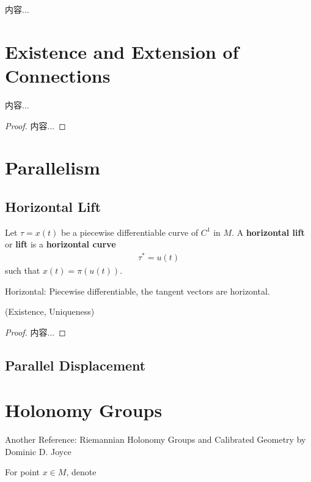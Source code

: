 \documentclass[Total.tex]{subfiles}
\begin{document}
			\begin{proposition}
				内容...
			\end{proposition}
		
		\section{Existence and Extension of Connections}
			
			\begin{theorem}
				内容...
			\end{theorem}
			\begin{proof}
				内容...
			\end{proof}
		\section{Parallelism}
			\subsection{Horizontal Lift}
				
				\begin{Def}
					Let $\tau=x(t)$ be a piecewise differentiable curve of $C^1$ in $M$. A \textbf{horizontal lift} or \textbf{lift} is a \textbf{horizontal curve}
					\begin{gather*}
						\tau^*=u(t)
					\end{gather*}
					such that $x(t)=\pi(u(t))$. 
					
					Horizontal: Piecewise differentiable, the tangent vectors are horizontal.
				\end{Def}
				
				\begin{proposition}
					(Existence, Uniqueness)
				\end{proposition}
				\begin{proof}
					内容...
				\end{proof}
				
			\subsection{Parallel Displacement}
		
		\section{Holonomy Groups}
		
			Another Reference: Riemannian Holonomy Groups
			and Calibrated Geometry by Dominic D. Joyce
			\begin{Def}
				For point $x\in M$, denote
			\end{Def}
\end{document}

